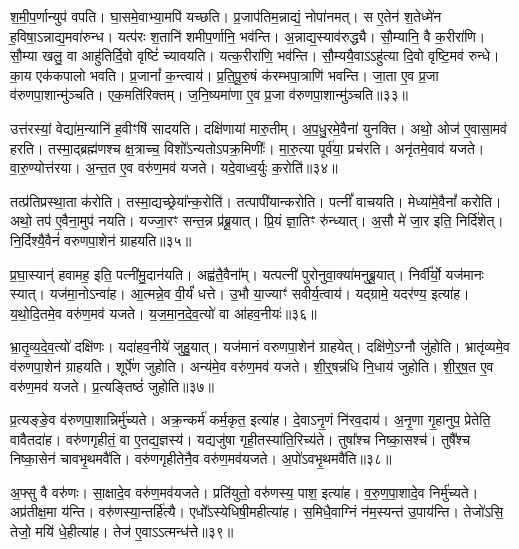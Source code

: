 श॒मी॒प॒र्णान्युप॑ वपति।
घा॒समे॒वाभ्या॒मपि॑ यच्छति।
प्र॒जा\-प॑तिम॒न्नाद्यं॒ नोपा॑नमत्।
स ए॒तेन॑ श॒तेध्मे॑न ह॒विषा॒\-ऽन्नाद्य॒मवा॑रुन्ध।
यत्प॑रः श॒तानि॑ शमीप॒र्णानि॒ भव॑न्ति।
अ॒न्नाद्य॒स्याव॑रुद्ध्यै।
सौ॒म्यानि॒ वै क॒रीरा॑णि।
सौ॒म्या खलु॒ वा आहु॑तिर्दि॒वो वृष्टिं॑ च्यावयति।
यत्क॒रीरा॑णि॒ भव॑न्ति।
सौ॒म्ययै॒वाऽऽहु॑त्या दि॒वो वृष्टि॒मव॑ रुन्धे।
का॒य एक॑कपालो भवति।
प्र॒जानां᳚ क॒न्त्वाय॑।
प्र॒ति॒पू॒रु॒षं क॑रम्भपा॒त्राणि॑ भवन्ति।
जा॒ता ए॒व प्र॒जा व॑रुणपा॒शान्मु॑ञ्चति।
एक॒मति॑रिक्तम्।
ज॒नि॒ष्यमा॑णा ए॒व प्र॒जा व॑रुणपा॒शान्मु॑ञ्चति॥३३॥\anuvakamend[नि॒रु॒प्यन्ते॑ भवतो॒ भव॑ति मेध्य॒त्वाय॑ रुन्धे॒ षट्च॑]

उत्त॑रस्यां॒ वेद्या॑म॒न्यानि॑ ह॒वीꣳषि॑ सादयति।
दक्षि॑णायां मारु॒तीम्।
अ॒प॒धु॒रमे॒वैना॑ युनक्ति।
अथो॒ ओज॑ ए॒वासा॒मव॑ हरति।
तस्मा॒द्ब्रह्म॑णश्च क्ष॒त्राच्च॒ विशो᳚\-ऽन्यतो\-ऽपक्र॒मिणीः᳚।
मा॒रु॒त्या पूर्व॑या॒ प्रच॑रति।
अनृ॑तमे॒वाव॑ यजते।
वा॒रु॒ण्योत्त॑रया।
अ॒न्त॒त ए॒व वरु॑ण॒मव॑ यजते।
यदे॒वाध्व॒र्युः क॒रोति॑॥३४॥

तत्प्र॑तिप्रस्था॒ता क॑रोति।
तस्मा॒द्यच्छ्रेया᳚न्क॒रोति॑।
तत्पापी॑\-यान्करोति।
पत्नीं᳚ वाचयति।
मेध्या॑मे॒वैनां᳚ करोति।
अथो॒ तप॑ ए॒वैना॒मुप॑ नयति।
यज्जा॒रꣳ सन्त॒न्न प्र॑ब्रू॒यात्।
प्रि॒यं ज्ञा॒तिꣳ रु॑न्ध्यात्।
अ॒सौ मे॑ जा॒र इति॒ निर्दि॑शेत्।
नि॒र्दिश्यै॒वैनं॑ वरुणपा॒शेन॑ ग्राहयति॥३५॥

प्र॒घा॒स्यान्॑ हवामह॒ इति॒ पत्नी॑मु॒दान॑यति।
अह्व॑तै॒वैना᳚म्।
यत्पत्नी॑ पुरोनुवा॒क्या॑मनुब्रू॒यात्।
निर्वी᳚र्यो॒ यज॑मानः स्यात्।
यज॑मा॒नो\-ऽन्वा॑ह।
आ॒त्मन्ने॒व वी॒र्यं॑ धत्ते।
उ॒भौ या॒ज्याꣳ॑ सवीर्य॒त्वाय॑।
यद्ग्रामे॒ यदर॑ण्य॒ इत्या॑ह।
य॒थो॒दि॒तमे॒व वरु॑ण॒मव॑ यजते।
य॒ज॒मा॒न॒दे॒व॒त्यो॑ वा आ॑हव॒नीयः॑॥३६॥

भ्रा॒तृ॒व्य॒दे॒व॒त्यो॑ दक्षि॑णः।
यदा॑हव॒नीये॑ जुहु॒यात्।
यज॑मानं वरुणपा॒शेन॑ ग्राहयेत्।
दक्षि॑णे॒\-ऽग्नौ जु॑होति।
भ्रातृ॑व्यमे॒व व॑रुणपा॒शेन॑ ग्राहयति।
शूर्पे॑ण जुहोति।
अन्य॑मे॒व वरु॑ण॒मव॑ यजते।
शी॒र्॒षन्न॑धि नि॒धाय॑ जुहोति।
शी॒र्॒\mbox{}ष॒त ए॒व वरु॑ण॒मव॑ यजते।
प्र॒त्यङ्तिष्ठं॑ जुहोति॥३७॥

प्र॒त्यङ्ङे॒व व॑रुणपा॒शान्निर्मु॑च्यते।
अक्र॒न्कर्म॑ कर्म॒कृत॒ इत्या॑ह।
दे॒वा\-ऽनृ॒णं नि॑रव॒दाय॑।
अ॒नृ॒णा गृ॒हानुप॒ प्रेतेति॒ वावैतदा॑ह।
वरु॑णगृहीतं॒ वा ए॒तद्य॒ज्ञस्य॑।
यद्यजु॑षा गृही॒तस्या॑ति॒\-रिच्य॑ते।
तुषा᳚श्च निष्का॒सश्च॑।
तुषै᳚श्च निष्का॒सेन॑ चावभृ॒थमवै॑ति।
वरु॑णगृहीतेनै॒व वरु॑ण॒मव॑यजते।
अ॒पो॑\-ऽवभृ॒थमवै॑ति॥३८॥

अ॒फ्सु वै वरु॑णः।
सा॒क्षादे॒व वरु॑ण॒मव॑यजते।
प्रति॑\-युतो॒ वरु॑णस्य॒ पाश॒ इत्या॑ह।
व॒रु॒ण॒पा॒शादे॒व निर्मु॑च्यते।
अप्र॑तीक्ष॒मा य॑न्ति।
वरु॑णस्या॒न्तर्\mbox{}हि॑त्यै।
एधो᳚ऽस्येधिषी॒मही\-त्या॑ह।
स॒मिधै॒वाग्निं न॑म॒स्यन्त॑ उ॒पाय॑न्ति।
तेजो॑ऽसि॒ तेजो॒ मयि॑ धे॒हीत्या॑ह।
तेज॑ ए॒वाऽऽत्मन्ध॑त्ते॥३९॥

